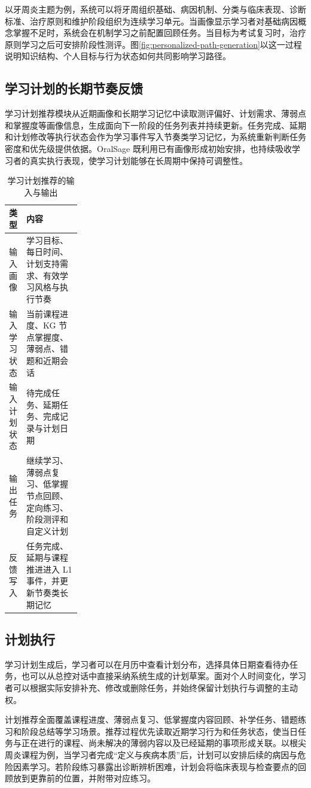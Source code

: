 以牙周炎主题为例，系统可以将牙周组织基础、病因机制、分类与临床表现、诊断标准、治疗原则和维护阶段组织为连续学习单元。当画像显示学习者对基础病因概念掌握不足时，系统会在机制学习之前配置回顾任务。当目标为考试复习时，治疗原则学习之后可安排阶段性测评。图\ref{fig:personalized-path-generation}以这一过程说明知识结构、个人目标与行为状态如何共同影响学习路径。

\subsection{学习计划的长期节奏反馈}

学习计划推荐模块从近期画像和长期学习记忆中读取测评偏好、计划需求、薄弱点和掌握度等画像信息，生成面向下一阶段的任务列表并持续更新。任务完成、延期和计划修改等执行状态会作为学习事件写入节奏类学习记忆，为系统重新判断任务密度和优先级提供依据。OralSage 既利用已有画像形成初始安排，也持续吸收学习者的真实执行表现，使学习计划能够在长周期中保持可调整性。

\begin{table}[H]
  \centering
  \caption{学习计划推荐的输入与输出}
  \label{tab:study-plan-io}
  \begin{tabularx}{\linewidth}{p{0.24\linewidth}X}
    \toprule
    类型 & 内容 \\
    \midrule
    输入画像 & 学习目标、每日时间、计划支持需求、有效学习风格与执行节奏 \\
    输入学习状态 & 当前课程进度、KG 节点掌握度、薄弱点、错题和近期会话 \\
    输入计划状态 & 待完成任务、延期任务、完成记录与计划日期 \\
    输出任务 & 继续学习、薄弱点复习、低掌握节点回顾、定向练习、阶段测评和自定义计划 \\
    反馈写入 & 任务完成、延期与课程推进进入 L1 事件，并更新节奏类长期记忆 \\
    \bottomrule
  \end{tabularx}
\end{table}

\subsection{计划执行}

学习计划生成后，学习者可以在月历中查看计划分布，选择具体日期查看待办任务，也可以从总控对话中直接采纳系统生成的计划草案。面对个人时间变化，学习者可以根据实际安排补充、修改或删除任务，并始终保留计划执行与调整的主动权。

计划推荐全面覆盖课程进度、薄弱点复习、低掌握度内容回顾、补学任务、错题练习和阶段总结等学习场景。推荐过程优先读取近期学习行为和任务状态，使当日任务与正在进行的课程、尚未解决的薄弱内容以及已经延期的事项形成关联。以根尖周炎课程为例，当学习者完成“定义与疾病本质”后，计划可以安排后续的病因与危险因素学习。若阶段练习暴露出诊断辨析困难，计划会将临床表现与检查要点的回顾放到更靠前的位置，并附带对应练习。


